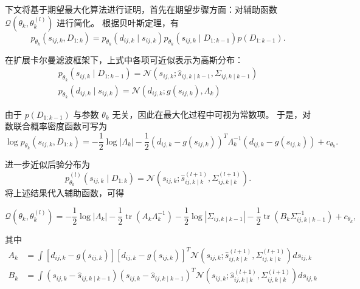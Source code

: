 下文将基于期望最大化算法进行证明，首先在期望步骤方面：对辅助函数  $\mathcal{Q}\left(\theta_{k}, \theta_{k}^{(l)}\right)$  进行简化。
根据贝叶斯定理，有
\begin{equation}
p_{\theta_{k}}\left(s_{i j, k}, D_{1: k}\right)=p_{\theta_{k}}\left(d_{i j, k} \mid s_{i j, k}\right) p_{\theta_{k}}\left(s_{i j, k} \mid D_{1: k-1}\right) p\left(D_{1: k-1}\right) .
\end{equation}

在扩展卡尔曼滤波框架下，上式中各项可近似表示为高斯分布：
\begin{equation}
\begin{array}{c}
p_{\theta_{k}}\left(s_{i j, k} \mid D_{1: k-1}\right)=\mathcal{N}\left(s_{i j, k} ; \hat{s}_{i j, k \mid k-1}, \Sigma_{i j, k \mid k-1}\right) \\
p_{\theta_{k}}\left(d_{i j, k} \mid s_{i j, k}\right)=\mathcal{N}\left(d_{i j, k} ; g\left(s_{i j, k}\right), \Lambda_{k}\right)
\end{array}
\end{equation}

由于  $p\left(D_{1: k-1}\right)$  与参数  $\theta_{k}$  无关，因此在最大化过程中可视为常数项。
于是，对数联合概率密度函数可写为
\begin{equation}
\log p_{\theta_{k}}\left(s_{i j, k}, D_{1: k}\right)=-\frac{1}{2} \log \left|\Lambda_{k}\right|-\frac{1}{2}\left(d_{i j, k}-g\left(s_{i j, k}\right)\right)^{T} \Lambda_{k}^{-1}\left(d_{i j, k}-g\left(s_{i j, k}\right)\right)+c_{\theta_{k}} .
\end{equation}

进一步近似后验分布为
\begin{equation}
p_{\theta_{k}}^{(l)}\left(s_{i j, k} \mid D_{1: k}\right)=\mathcal{N}\left(s_{i j, k} ; \hat{s}_{i j, k \mid k}^{(l+1)}, \Sigma_{i j, k \mid k}^{(l+1)}\right) .
\end{equation}
将上述结果代入辅助函数，可得

\begin{equation}
\mathcal{Q}\left(\theta_{k}, \theta_{k}^{(l)}\right)=-\frac{1}{2} \log \left|\Lambda_{k}\right|-\frac{1}{2} \operatorname{tr}\left(A_{k} \Lambda_{k}^{-1}\right)-\frac{1}{2} \log \left|\Sigma_{i j, k \mid k-1}\right|-\frac{1}{2} \operatorname{tr}\left(B_{k} \Sigma_{i j, k \mid k-1}^{-1}\right)+c_{\theta_{k}},
\end{equation}

其中
\begin{equation}
\begin{aligned}
A_{k} & =\int\left[d_{i j, k}-g\left(s_{i j, k}\right)\right]\left[d_{i j, k}-g\left(s_{i j, k}\right)\right]^{T} \mathcal{N}\left(s_{i j, k} ; \hat{s}_{i j, k \mid k}^{(l+1)}, \Sigma_{i j, k \mid k}^{(l+1)}\right) d s_{i j, k} \\
B_{k} & =\int\left(s_{i j, k}-\hat{s}_{i j, k \mid k-1}\right)\left(s_{i j, k}-\hat{s}_{i j, k \mid k-1}\right)^{T} \mathcal{N}\left(s_{i j, k} ; \hat{s}_{i j, k \mid k}^{(l+1)}, \Sigma_{i j, k \mid k}^{(l+1)}\right) d s_{i j, k}
\end{aligned}
\end{equation}

